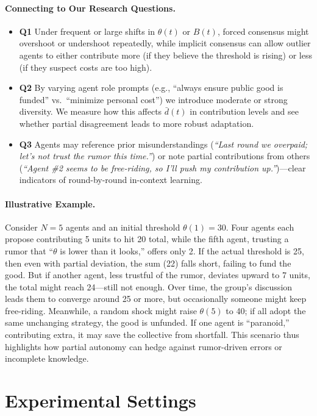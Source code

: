 \paragraph{Connecting to Our Research Questions.}
\begin{itemize}
    \item \textbf{Q1} Under frequent or large shifts in $\theta(t)$ or $B(t)$, forced consensus might overshoot or undershoot repeatedly, while implicit consensus can allow outlier agents to either contribute more (if they believe the threshold is rising) or less (if they suspect costs are too high).
    \item \textbf{Q2} By varying agent role prompts (e.g., “always ensure public good is funded” vs.\ “minimize personal cost”) we introduce moderate or strong diversity. We measure how this affects $\bar{d}(t)$ in contribution levels and see whether partial disagreement leads to more robust adaptation.
    \item \textbf{Q3} Agents may reference prior misunderstandings (\emph{“Last round we overpaid; let's not trust the rumor this time.”}) or note partial contributions from others (\emph{“Agent \#2 seems to be free-riding, so I’ll push my contribution up.”})—clear indicators of round-by-round in-context learning.
\end{itemize}

\paragraph{Illustrative Example.}
Consider $N=5$ agents and an initial threshold $\theta(1)=30$. Four agents each propose contributing 5 units to hit 20 total, while the fifth agent, trusting a rumor that “\(\theta\) is lower than it looks,” offers only 2. If the actual threshold is 25, then even with partial deviation, the sum (22) falls short, failing to fund the good. But if another agent, less trustful of the rumor, deviates upward to 7 units, the total might reach 24—still not enough. Over time, the group’s discussion leads them to converge around 25 or more, but occasionally someone might keep free-riding. Meanwhile, a random shock might raise $\theta(5)$ to 40; if all adopt the same unchanging strategy, the good is unfunded. If one agent is “paranoid,” contributing extra, it may save the collective from shortfall. This scenario thus highlights how partial autonomy can hedge against rumor-driven errors or incomplete knowledge.

\section{Experimental Settings}
\label{sec:appendix:b}

